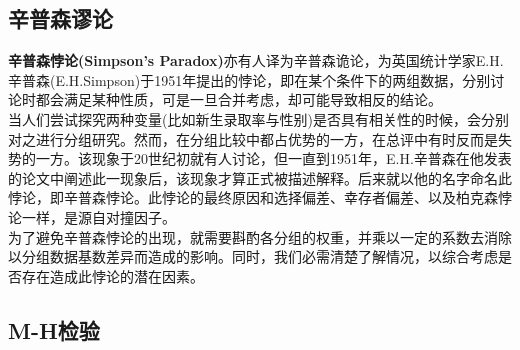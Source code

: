 \documentclass[a4paper, 11pt]{article}
\begin{document}
\subsection{辛普森谬论}
\textbf{辛普森悖论(Simpson's Paradox)}亦有人译为辛普森诡论，为英国统计学家E.H.辛普森(E.H.Simpson)于1951年提出的悖论，即在某个条件下的两组数据，分别讨论时都会满足某种性质，可是一旦合并考虑，却可能导致相反的结论。\\
\indent 当人们尝试探究两种变量(比如新生录取率与性别)是否具有相关性的时候，会分别对之进行分组研究。然而，在分组比较中都占优势的一方，在总评中有时反而是失势的一方。该现象于20世纪初就有人讨论，但一直到1951年，E.H.辛普森在他发表的论文中阐述此一现象后，该现象才算正式被描述解释。后来就以他的名字命名此悖论，即辛普森悖论。此悖论的最终原因和选择偏差、幸存者偏差、以及柏克森悖论一样，是源自对撞因子。\\
\indent 为了避免辛普森悖论的出现，就需要斟酌各分组的权重，并乘以一定的系数去消除以分组数据基数差异而造成的影响。同时，我们必需清楚了解情况，以综合考虑是否存在造成此悖论的潜在因素。
\subsection{M-H检验}
\end{document}
